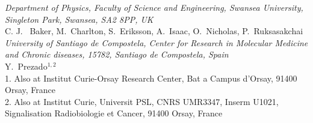 \noindent \textit{Department of Physics, Faculty of Science and Engineering, Swansea University, Singleton Park, Swansea, SA2 8PP, UK} \\
C. J. ~Baker, M.~Charlton, S.~Eriksson, A.~Isaac, O.~Nicholas, P.~Ruksasakchai \\
 
\noindent \textit{University of Santiago de Compostela, Center for Research in Molecular Medicine and Chronic diseases, 15782, Santiago de Compostela, Spain} \\
Y.~Prezado$^{1, 2}$ \\
{\footnotesize
  1. Also at Institut Curie-Orsay Research Center, Bat a Campus d'Orsay, 91400 Orsay, France \\
  2. Also at Institut Curie, Universit PSL, CNRS UMR3347, Inserm U1021, Signalisation Radiobiologie et Cancer, 91400 Orsay, France \\
}
 
\vspace{0.5cm}
